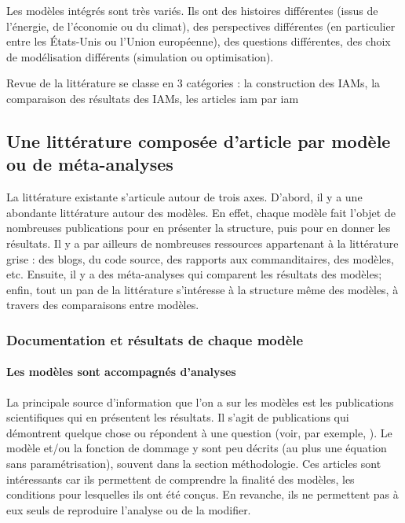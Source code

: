 Les modèles intégrés sont très variés. Ils ont des histoires différentes (issus de l'énergie, de l'économie ou du climat), des perspectives différentes (en particulier entre les États-Unis ou l'Union européenne), des questions différentes, des choix de modélisation différents (simulation ou optimisation). 

Revue de la littérature se classe en 3 catégories : la construction des IAMs, la comparaison des résultats des IAMs, les articles iam par iam

\subsection{Une littérature composée d'article par modèle ou de méta-analyses}

La littérature existante s'articule autour de trois axes. D'abord, il y a une abondante littérature autour des modèles. En effet, chaque modèle fait l'objet de nombreuses publications pour en présenter la structure, puis pour en donner les résultats. Il y a par ailleurs de nombreuses ressources appartenant à la littérature grise : des blogs, du code source, des rapports aux commanditaires, des modèles, etc. Ensuite, il y a des méta-analyses qui comparent les résultats des modèles; enfin, tout un pan de la littérature s'intéresse à la structure même des modèles, à travers des comparaisons entre modèles. 

\subsubsection{Documentation et résultats de chaque modèle}

\paragraph{Les modèles sont accompagnés d'analyses}

La principale source d'information que l'on a sur les modèles est les publications scientifiques qui en présentent les résultats.
Il s'agit de publications qui démontrent quelque chose ou répondent à une question (voir, par exemple, \autocite{int_panis_externe_2000, dafermos_how_2021, baumstark_remind21_2021, dafermos_stock-flow-fund_2017, cherp_global_2016, burke_global_2015}). Le modèle et/ou la fonction de dommage y sont peu décrits (au plus une équation sans paramétrisation), souvent dans la section méthodologie. Ces articles sont intéressants car ils permettent de comprendre la finalité des modèles, les conditions pour lesquelles ils ont été conçus. En revanche, ils ne permettent pas à eux seuls de reproduire l'analyse ou de la modifier. 


